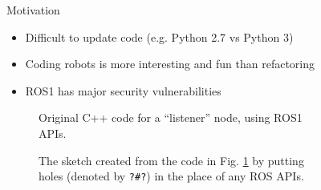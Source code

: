 \documentclass[final]{beamer}
\newlength{\sepwid}
\newlength{\onecolwid}
\newlength{\twocolwid}
\begin{document}
\begin{frame}[t]
\begin{columns}[t]
\begin{column}{\onecolwid}
\begin{block}{Motivation}

\begin{itemize}
\item Difficult to update code (e.g. Python 2.7 vs Python 3)
\item Coding robots is more interesting and fun than refactoring
\item ROS1 has major security vulnerabilities
\end{itemize}

\end{block}


\begin{figure}

\caption{Original C++ code for a ``listener'' node, using ROS1 APIs.}
\label{fig:listenercode}
\end{figure}

\begin{figure}


\caption{The sketch created from the code in Fig. \ref{fig:listenercode} by putting holes (denoted by \texttt{?\#?}) in the place of any ROS APIs.}
\end{figure}


\end{column} %

\begin{column}{\sepwid}\end{column} %

\begin{column}{\twocolwid} %


\begin{figure}


\end{figure}
\end{column}
\end{columns}
\end{frame}
\end{document}
